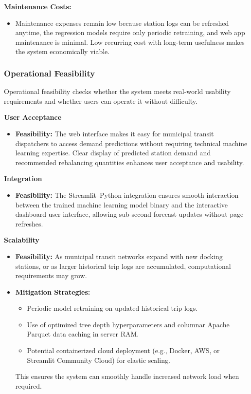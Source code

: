 \documentclass[12pt, a4paper]{article}
\renewcommand{\_}{\textunderscore\allowbreak}
\begin{document}
\noindent \textbf{Maintenance Costs:}
\begin{itemize}
    \item Maintenance expenses remain low because station logs can be refreshed anytime, the regression models require only periodic retraining, and web app maintenance is minimal. Low recurring cost with long-term usefulness makes the system economically viable.
\end{itemize}

\subsubsection{Operational Feasibility}

Operational feasibility checks whether the system meets real-world usability requirements and whether users can operate it without difficulty.

\noindent \textbf{User Acceptance}
\begin{itemize}
    \item \textbf{Feasibility:} The web interface makes it easy for municipal transit dispatchers to access demand predictions without requiring technical machine learning expertise. Clear display of predicted station demand and recommended rebalancing quantities enhances user acceptance and usability.
\end{itemize}

\noindent \textbf{Integration}
\begin{itemize}
    \item \textbf{Feasibility:} The Streamlit--Python integration ensures smooth interaction between the trained machine learning model binary and the interactive dashboard user interface, allowing sub-second forecast updates without page refreshes.
\end{itemize}

\noindent \textbf{Scalability}
\begin{itemize}
    \item \textbf{Feasibility:} As municipal transit networks expand with new docking stations, or as larger historical trip logs are accumulated, computational requirements may grow.
    \item \textbf{Mitigation Strategies:}
    \begin{itemize}
        \item Periodic model retraining on updated historical trip logs.
        \item Use of optimized tree depth hyperparameters and columnar Apache Parquet data caching in server RAM.
        \item Potential containerized cloud deployment (e.g., Docker, AWS, or Streamlit Community Cloud) for elastic scaling.
    \end{itemize}
    This ensures the system can smoothly handle increased network load when required.
\end{itemize}
\end{document}
